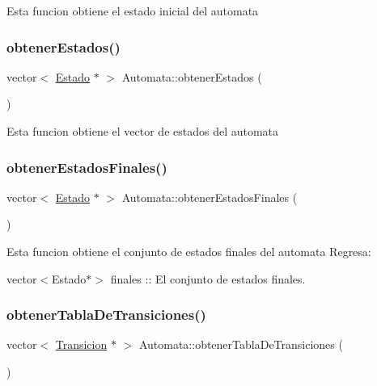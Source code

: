 Esta funcion obtiene el estado inicial del automata \mbox{\label{class_automata_a9c728bd19771264ac35e95fd8b97069a}} 
\subsubsection{\texorpdfstring{obtener\+Estados()}{obtenerEstados()}}
{\footnotesize\ttfamily vector$<$ \hyperlink{class_estado}{Estado} $\ast$ $>$ Automata\+::obtener\+Estados (\begin{DoxyParamCaption}{ }\end{DoxyParamCaption})}

Esta funcion obtiene el vector de estados del automata \mbox{\label{class_automata_a57e9a913a7264f19b14401f01110df24}} 
\subsubsection{\texorpdfstring{obtener\+Estados\+Finales()}{obtenerEstadosFinales()}}
{\footnotesize\ttfamily vector$<$ \hyperlink{class_estado}{Estado} $\ast$ $>$ Automata\+::obtener\+Estados\+Finales (\begin{DoxyParamCaption}{ }\end{DoxyParamCaption})}

Esta funcion obtiene el conjunto de estados finales del automata Regresa\+:
\begin{DoxyItemize}
\item vector$<$\+Estado$\ast$$>$ finales \+:\+: El conjunto de estados finales. 
\end{DoxyItemize}\mbox{\label{class_automata_ae2b571c39f955aafb293ea9605a4a1bb}} 
\subsubsection{\texorpdfstring{obtener\+Tabla\+De\+Transiciones()}{obtenerTablaDeTransiciones()}}
{\footnotesize\ttfamily vector$<$ \hyperlink{class_transicion}{Transicion} $\ast$ $>$ Automata\+::obtener\+Tabla\+De\+Transiciones (\begin{DoxyParamCaption}{ }\end{DoxyParamCaption})}

